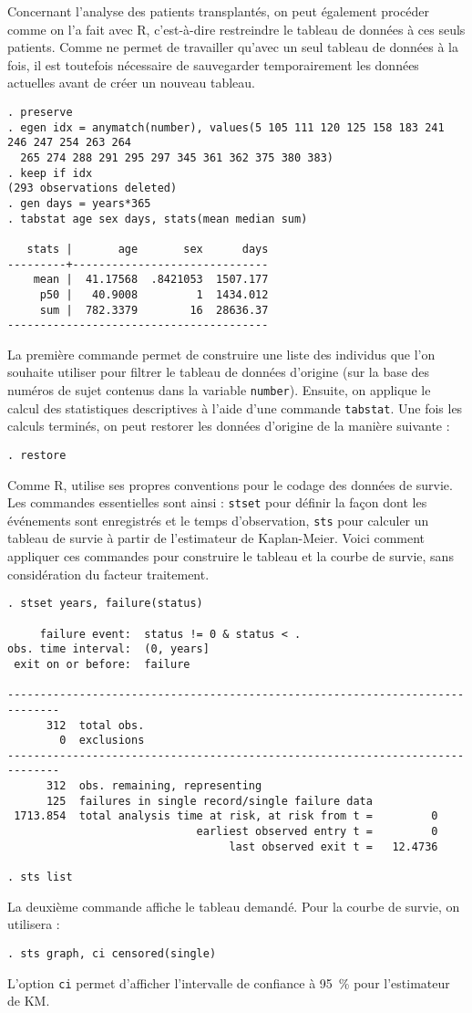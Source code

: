 Concernant l'analyse des patients transplantés, on peut également procéder
comme on l'a fait avec R, c'est-à-dire restreindre le tableau de données à
ces seuls patients. Comme \Stata ne permet de travailler qu'avec un seul
tableau de données à la fois, il est toutefois nécessaire de sauvegarder
temporairement les données actuelles avant de créer un nouveau tableau.
\begin{verbatim}
. preserve
. egen idx = anymatch(number), values(5 105 111 120 125 158 183 241 246 247 254 263 264
  265 274 288 291 295 297 345 361 362 375 380 383)
. keep if idx
(293 observations deleted)
. gen days = years*365
. tabstat age sex days, stats(mean median sum)

   stats |       age       sex      days
---------+------------------------------
    mean |  41.17568  .8421053  1507.177
     p50 |   40.9008         1  1434.012
     sum |  782.3379        16  28636.37
----------------------------------------
\end{verbatim}
La première commande permet de construire une liste des individus que l'on
souhaite utiliser pour filtrer le tableau de données d'origine (sur la base
des numéros de sujet contenus dans la variable \texttt{number}). Ensuite, on
applique le calcul des statistiques descriptives à l'aide d'une commande
\texttt{tabstat}. Une fois les calculs terminés, on peut restorer les
données d'origine de la manière suivante :
\begin{verbatim}
. restore
\end{verbatim}

Comme R, \Stata utilise ses propres conventions pour le codage des données de
survie. Les commandes essentielles sont ainsi : \texttt{stset} pour définir
la façon dont les événements sont enregistrés et le temps d'observation,
\texttt{sts} pour calculer un tableau de survie à partir de l'estimateur de
Kaplan-Meier. Voici comment appliquer ces commandes pour construire le
tableau et la courbe de survie, sans considération du facteur traitement.
\begin{verbatim}
. stset years, failure(status)

     failure event:  status != 0 & status < .
obs. time interval:  (0, years]
 exit on or before:  failure

------------------------------------------------------------------------------
      312  total obs.
        0  exclusions
------------------------------------------------------------------------------
      312  obs. remaining, representing
      125  failures in single record/single failure data
 1713.854  total analysis time at risk, at risk from t =         0
                             earliest observed entry t =         0
                                  last observed exit t =   12.4736

. sts list
\end{verbatim}
La deuxième commande affiche le tableau demandé. Pour la courbe de survie,
on utilisera :
\begin{verbatim}
. sts graph, ci censored(single)
\end{verbatim}
L'option \texttt{ci} permet d'afficher l'intervalle de confiance à 95~\%
pour l'estimateur de KM.

